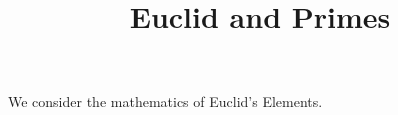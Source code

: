 \documentclass{ximera}
\title{Euclid and Primes}
\begin{document}
\begin{abstract}
\end{abstract}
\maketitle

We consider the mathematics of Euclid's Elements.
\end{document}
